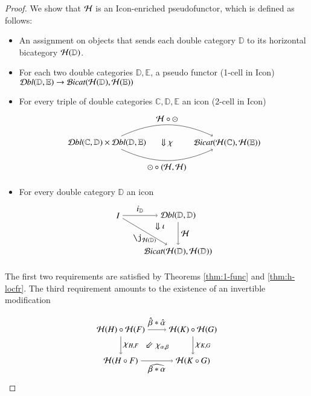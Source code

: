 \documentclass{amsart}
\begin{document}
\begin{proof}
We show that $\mathcal{H}$ is an Icon-enriched pseudofunctor, which is defined as follows:

\begin{itemize}
\item An assignment on objects that sends each double category $\mathbb{D}$ to its horizontal bicategory $\mathcal{H}(\mathbb{D})$.
\item For each two double categories $\mathbb{D}, \mathbb{E}$, a pseudo functor (1-cell in Icon) $\mathcal{D}bl(\mathbb{D}, \mathbb{E}) \rightarrow \mathcal{B}icat(\mathcal{H}(\mathbb{D}),\mathcal{H}(\mathbb{E}))$
\item For every triple of double categories $\mathbb{C}, \mathbb{D}, \mathbb{E}$ an icon (2-cell in Icon) 
\begin{align} 
\begin{tikzpicture}
\node(1) at (0,0) {$\mathcal{D}bl(\mathbb{C},\mathbb{D}) \times \mathcal{D}bl(\mathbb{D},\mathbb{E})$};
\node(2) at (5,0) {$\mathcal{B}icat(\cH(\mathbb{C}),\cH(\mathbb{E}))$};
\draw[->] (1) to[in=155, out=25] node[above]{$\cH \circ \odot$} (2); 
\draw[->] (1) to[in=-155, out=-25] node[below]{$\odot \circ (\cH,\cH)$} (2); 
\node at (2.5,0) {$\Downarrow \chi$};
\end{tikzpicture}
\end{align}
\item For every double category $\mathbb{D}$ an icon
\begin{align}
\begin{tikzpicture}[xscale=.5, yscale=.3]
\node(1) at (0,0) {$I$};
\node(2) at (5,0) {$\mathcal{D}bl(\mathbb{D},\mathbb{D})$};
\node(3) at (5,-5) {$\mathcal{B}icat(\cH(\mathbb{D}),\cH(\mathbb{D}))$};
\draw[->] (1) to node[above]{$i_{\mathbb{D}}$} (2); 
\draw[->] (1) to node[below]{$\j_{\cH(\mathbb{D})}$} (3);
\draw[->] (2) to node[right]{$\cH$} (3); 
\node at (3.5,-1.5) {$\Downarrow \iota$};
\end{tikzpicture}
\end{align}
\end{itemize}

The first two requirements are satisfied by Theorems \ref{thm:1-func} and \ref{thm:h-locfr}. The third requirement amounts to the existence of an invertible modification

\begin{equation}
\begin{tikzpicture}[xscale=0.75, yscale=1.3]
\node (tl) at (0,2) {${\cH}(H) \circ {\cH}(F)$};
\node (bl) at (0,1) {${\cH}(H \circ F)$};
\node (tr) at (4,2) {${\cH}(K) \circ {\cH}(G)$};
\node (br) at (4,1) {${\cH}(K \circ G)$};
\draw[->] (tl) to node [above] {$\hat{\beta} * \hat{\alpha}$} (tr);
\draw[->] (tr) to node [right] {$\chi_{K,G}$} (br);
\draw[->] (tl) to node [right] {$\chi_{H,F}$} (bl);
\draw[->] (bl) to node [below] {$\widehat{\be*\al}$} (br);
\node at (2,1.5) {$\Arrow{5} \chi_{\alpha,\beta} $};
\end{tikzpicture}
\end{equation}


\end{proof}
\end{document}
